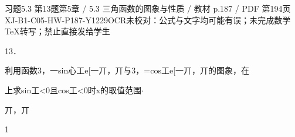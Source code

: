 \begin{bankitem}{习题5.3 第13题}{第5章 / 5.3 三角函数的图象与性质 / 教材 p.187 / PDF 第194页}{XJ-B1-C05-HW-P187-Y1229}{OCR未校对：公式与文字均可能有误；未完成数学TeX转写；禁止直接发给学生}
\begin{ocrdraft}
\par
13．
\par
利用函数3，一sin心工e[一丌，丌与3，=cos工e[一丌，丌的图象，在
\par
上求sin工<0且cos工<0时x的取值范围\ensuremath{\cdot}
\par
丌，丌
\par
1
\end{ocrdraft}
\end{bankitem}
